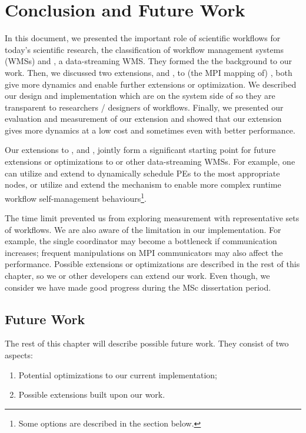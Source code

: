 \chapter{Conclusion and Future Work}
In this document, we presented the important role of scientific workflows for today's scientific research, the classification of workflow management systems (WMSs) and \dpy, a data-streaming WMS. They formed the the background to our work. Then, we discussed two extensions, \tincdep and \tdynexp, to (the MPI mapping of) \dpy, both give \dpy more dynamics and enable further extensions or optimization. We described our design and implementation which are on the system side of \dpy so they are transparent to researchers / designers of workflows. Finally, we presented our evaluation and measurement of our extension and showed that our extension gives \dpy more dynamics at a low cost and sometimes even with better performance.

Our extensions to \dpy, \tincdep and \tdynexp, jointly form a significant starting point for future extensions or optimizations to \dpy or other data-streaming WMSs. For example, one can utilize and extend \tincdep to dynamically schedule PEs to the most appropriate nodes, or utilize and extend the \tdynexp mechanism to enable more complex runtime workflow self-management behaviours\footnote{Some options are described in the  section below.}.

The time limit prevented us from exploring measurement with representative sets of workflows. We are also aware of the limitation in our implementation. For example, the single coordinator may become a bottleneck if communication increases; frequent manipulations on MPI communicators may also affect the performance. Possible extensions or optimizations are described in the rest of this chapter, so we or other developers can extend our work. Even though, we consider we have made good progress during the MSc dissertation period.

\section{Future Work}
The rest of this chapter will describe possible future work. They consist of two aspects:
\begin{enumerate}
	\item Potential optimizations to our current implementation;
	\item Possible extensions built upon our work.
\end{enumerate}


